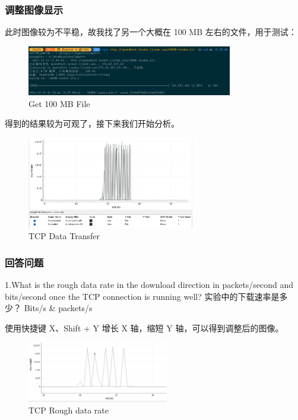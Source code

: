 \documentclass[14pt,a4paper,UTF8,twoside]{article}
\begin{document}
\subsubsection{调整图像显示}

此时图像较为不平稳，故我找了另一个大概在 100 MB 左右的文件，用于测试：

\begin{figure}[H]
	\centering
	\includegraphics[width=0.8\textwidth]{lab6/get100.png}
	\caption{Get 100 MB File}
\end{figure}

得到的结果较为可观了，接下来我们开始分析。

\begin{figure}[H]
	\centering
	\includegraphics[width=0.65\textwidth]{lab6/result2.png}
	\caption{TCP Data Transfer}
\end{figure}

\subsubsection{回答问题}

\begin{rmr}
	1.What is the rough data rate in the download direction in packets/second and bits/second once the TCP connection is running well?
	实验中的下载速率是多少？ Bits/s \& packets/s
\end{rmr}

使用快捷键 X、Shift + Y 增长 X 轴，缩短 Y 轴，可以得到调整后的图像。

\begin{figure}[H]
	\centering
	\includegraphics[width=0.55\textwidth]{lab6/adjust.png}
	\caption{TCP Rough data rate}
\end{figure}
\end{document}
